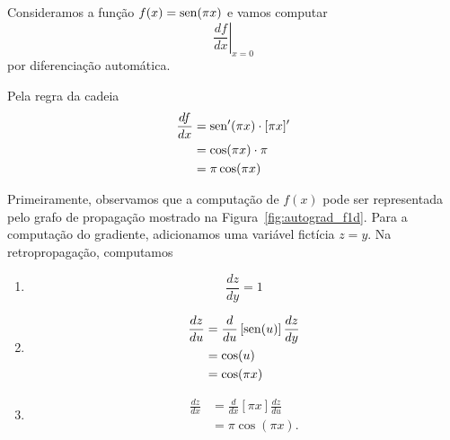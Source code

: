\begin{ex}
  Consideramos a função $f(x) = \operatorname{sen}(\pi x)$ e vamos computar
  \begin{equation}
    \left.\frac{d f}{d x}\right|_{x=0}
  \end{equation}
  por diferenciação automática.

  Pela regra da cadeia
  \begin{align}
    \frac{df}{dx} &= \operatorname{sen}'(\pi x)\cdot [\pi x]'\\
                  &= \cos(\pi x)\cdot \pi \\
                  &= \pi\cos(\pi x)
  \end{align}

  Primeiramente, observamos que a computação de $f(x)$ pode ser representada pelo grafo de propagação mostrado na Figura~\ref{fig:autograd_f1d}. Para a computação do gradiente, adicionamos uma variável fictícia $z = y$. Na retropropagação, computamos
  \begin{enumerate}[1.]
  \item
    \begin{equation}
      \frac{dz}{dy} = 1
    \end{equation}
  \item
    \begin{align}
      \frac{dz}{du} &= \frac{d}{du}\left[\operatorname{sen}(u)\right]\frac{dz}{dy}\\
                    &= \cos(u)\\
                    &= \cos(\pi x)
    \end{align}
  \item
    \begin{align}
      \frac{dz}{dx} &= \frac{d}{dx}\left[\pi x\right]\frac{dz}{du}\\
                    &= \pi\cos(\pi x).
    \end{align}
  \end{enumerate}
  


\end{ex}
